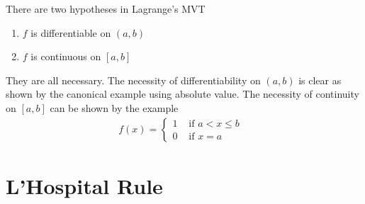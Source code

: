 \documentclass{report}
\begin{document}
\begin{mdframed}
There are two hypotheses in Lagrange's MVT 
\begin{enumerate}[label=(\alph*)]
  \item $f$ is differentiable on $(a,b)$ 
  \item $f$ is continuous on $[a,b]$
\end{enumerate}
They are all necessary. The necessity of differentiability on $(a,b)$ is clear as shown by the canonical example using absolute value. The necessity of continuity on $[a,b]$ can be shown by the example 
\begin{align*}
f(x)=\begin{cases}
  1& \text{ if $a<x\leq b$ }\\
  0& \text{ if  }x=a
\end{cases}
\end{align*}
\end{mdframed}
\section{L'Hospital Rule}
\end{document}
